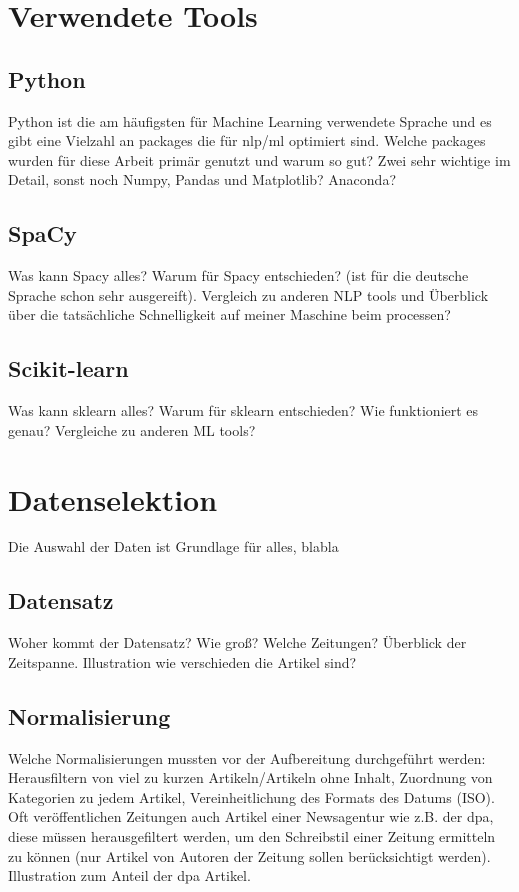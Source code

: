 \section{Verwendete Tools}
\subsection{Python}
Python ist die am häufigsten für Machine Learning verwendete Sprache und es gibt eine Vielzahl an packages die für nlp/ml optimiert sind. Welche packages wurden für diese Arbeit primär genutzt und warum so gut? Zwei sehr wichtige im Detail, sonst noch Numpy, Pandas und Matplotlib? Anaconda?
\subsection{SpaCy}
Was kann Spacy alles? Warum für Spacy entschieden? (ist für die deutsche Sprache schon sehr ausgereift). Vergleich zu anderen NLP tools und Überblick über die tatsächliche Schnelligkeit auf meiner Maschine beim processen?
\subsection{Scikit-learn}
Was kann sklearn alles? Warum für sklearn entschieden? Wie funktioniert es genau? Vergleiche zu anderen ML tools?
\section{Datenselektion}
Die Auswahl der Daten ist Grundlage für alles, blabla
\subsection{Datensatz}
Woher kommt der Datensatz? Wie groß? Welche Zeitungen? Überblick der Zeitspanne. Illustration wie verschieden die Artikel sind?
\subsection{Normalisierung}
Welche Normalisierungen mussten vor der Aufbereitung durchgeführt werden: Herausfiltern von viel zu kurzen Artikeln/Artikeln ohne Inhalt, Zuordnung von Kategorien zu jedem Artikel, Vereinheitlichung des Formats des Datums (ISO). Oft veröffentlichen Zeitungen auch Artikel einer Newsagentur wie z.B. der dpa, diese müssen herausgefiltert werden, um den Schreibstil einer Zeitung ermitteln zu können (nur Artikel von Autoren der Zeitung sollen berücksichtigt werden). Illustration zum Anteil der dpa Artikel.
